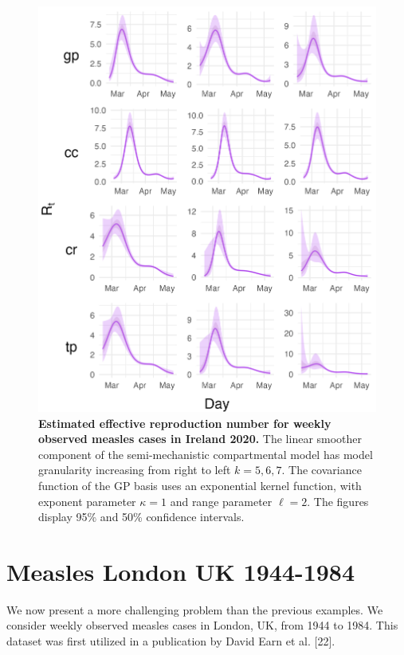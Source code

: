 \documentclass[
11pt, %
oneside, %
english, %
singlespacing, %
]{macthesis} %
\begin{document}
\begin{figure}[H]
\centering
\includegraphics[width=\textwidth, height = \textwidth]{figure/Ireland/Ireland_plot_gp(-3,5)_k(5,6,7)_gamma(014)_I0(10)_plot_R_t.png}
\caption[Estimated Covid-19 Effective Reproduction Number (2020)]{\textbf{Estimated effective reproduction number for weekly observed measles cases in Ireland 2020.} The linear smoother component of the semi-mechanistic compartmental model has model granularity increasing from right to left \(k= 5,6,7\). The covariance function of the GP basis uses an exponential kernel function, with exponent parameter \(\kappa = 1\) and range parameter \(\ell = 2\). The figures display 95\% and 50\% confidence intervals.}
\label{fig:ireland_rt}
\end{figure}

\section{Measles London UK 1944-1984}\label{Measles}

We now present a more challenging problem than the previous examples. We consider weekly observed measles cases in London, UK, from 1944 to 1984. This dataset was first utilized in a publication by David Earn et al. {[}22{]}.
\end{document}
